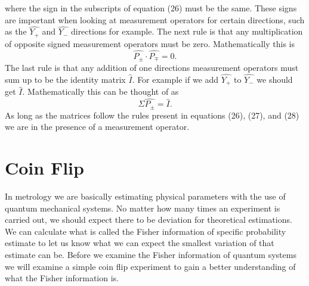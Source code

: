\documentclass[twocolumn]{article}
\begin{document}
where the sign in the subscripts of equation (26) must be the same. These signs are important when looking at measurement operators for certain directions, such as the $\hat{Y_{+}}$ and $\hat{Y_{-}}$ directions for example. The next rule is that any multiplication of opposite signed measurement operators must be zero. Mathematically this is
\begin{equation}
\hat{P_{\pm}}\cdot\hat{P_{\mp}}=0.
\end{equation}
The last rule is that any addition of one directions measurement operators must sum up to be the identity matrix $\hat{I}$. For example if we add $\hat{Y_{+}}$ to $\hat{Y_{-}}$ we should get $\hat{I}$. Mathematically this can be thought of as
\begin{equation}
\Sigma \hat{P_{\pm}}=\hat{I}.
\end{equation}
As long as the matrices follow the rules present in equations (26), (27), and (28) we are in the presence of a measurement operator.
\section*{Coin Flip}
In metrology we are basically estimating physical parameters with the use of quantum mechanical systems. No matter how many times an experiment is carried out, we should expect there to be deviation for theoretical estimations. We can calculate what is called the Fisher information of specific probability estimate to let us know what we can expect the smallest variation of that estimate can be. Before we examine the Fisher information of quantum systems we will examine a simple coin flip experiment to gain a better understanding of what the Fisher information is.
\end{document}
